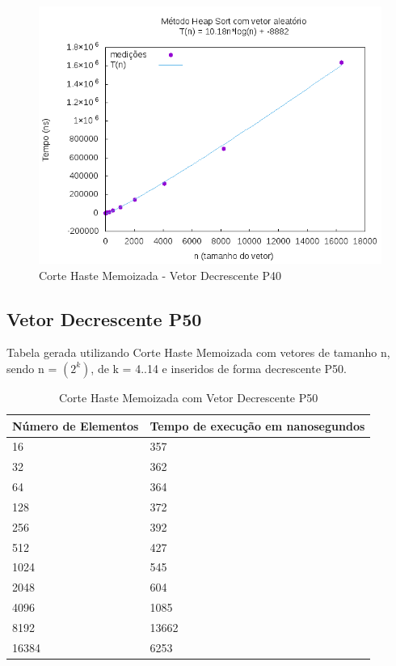 \documentclass[12pt,a4paper,twoside]{report}
\begin{document}
\begin{figure}[H]
    \centering
    \includegraphics[width=0.7\linewidth]{graficos/HeapSort/vIntAleatorio/vIntAleatorio.png}
  \caption{Corte Haste Memoizada - Vetor Decrescente P40}
\end{figure}


\subsection{Vetor Decrescente P50}
Tabela gerada utilizando Corte Haste Memoizada com vetores de tamanho n, sendo n = $(2^k)$, de k = 4..14 e inseridos de forma decrescente P50.
\begin{table}[H]
\centering
\caption{Corte Haste Memoizada com Vetor Decrescente P50}
\label{my-label}
\begin{tabular}{|l|l|}
\hline
\multicolumn{1}{|c|}{\textbf{Número de Elementos}} & \multicolumn{1}{c|}{\textbf{Tempo de execução em nanosegundos}} \\ \hline
16 & 357 \\ \hline
32 & 362 \\ \hline
64 & 364 \\ \hline
128 & 372 \\ \hline
256 & 392 \\ \hline
512 & 427 \\ \hline
1024 & 545 \\ \hline
2048 & 604 \\ \hline
4096 & 1085 \\ \hline
8192 & 13662 \\ \hline
16384 & 6253 \\ \hline
\end{tabular}
\end{table}
\end{document}

